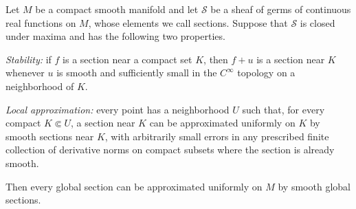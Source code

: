 \begin{lemma}\label{lem:compact-sheaf-regularization}
Let $M$ be a compact smooth manifold and let $\mathcal S$ be a sheaf of germs of continuous real functions on $M$, whose elements we call sections. Suppose that $\mathcal S$ is closed under maxima and has the following two properties.

\emph{Stability:} if $f$ is a section near a compact set $K$, then $f+u$ is a section near $K$ whenever $u$ is smooth and sufficiently small in the $C^\infty$ topology on a neighborhood of $K$.

\emph{Local approximation:} every point has a neighborhood $U$ such that, for every compact $K\Subset U$, a section near $K$ can be approximated uniformly on $K$ by smooth sections near $K$, with arbitrarily small errors in any prescribed finite collection of derivative norms on compact subsets where the section is already smooth.

Then every global section can be approximated uniformly on $M$ by smooth global sections.
\end{lemma}
